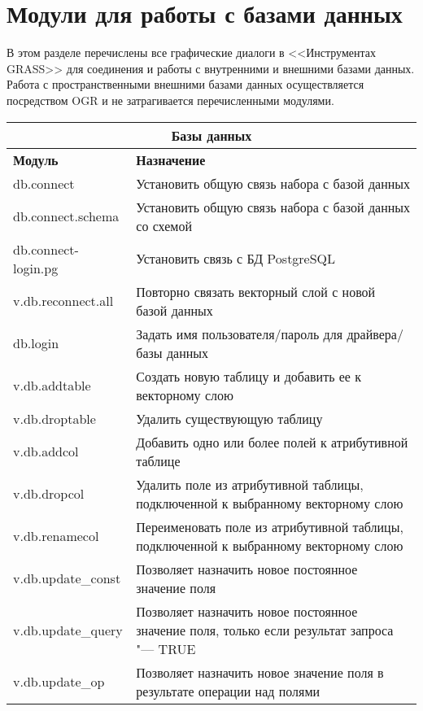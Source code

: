 \clearpage

\section{Модули для работы с базами данных}

В этом разделе перечислены все графические диалоги в <<Инструментах
GRASS>> для соединения и работы с внутренними и внешними
базами данных. Работа с пространственными внешними базами данных
осуществляется посредством OGR и не затрагивается перечисленными модулями.

{\renewcommand{\arraystretch}{0.7}
\begin{table}[H]
\centering
 \begin{tabular}{|p{4cm}|p{10cm}|}
  \hline \multicolumn{2}{|c|}{\textbf{Базы данных}} \\
  \hline \textbf{Модуль} & \textbf{Назначение} \\
  \hline db.connect & Установить общую связь набора с базой данных \\
  \hline db.connect.schema & Установить общую связь набора с базой
  данных со схемой \\
  \hline db.connect-login.pg & Установить связь с БД PostgreSQL \\
  \hline v.db.reconnect.all & Повторно связать векторный слой с новой базой
  данных \\
  \hline db.login & Задать имя пользователя/пароль для драйвера/базы
  данных \\
  \hline v.db.addtable & Создать новую таблицу и добавить ее к
  векторному слою \\
  \hline v.db.droptable & Удалить существующую таблицу \\
  \hline v.db.addcol & Добавить одно или более полей к атрибутивной
  таблице \\
  \hline v.db.dropcol & Удалить поле из атрибутивной таблицы,
  подключенной к выбранному векторному слою \\
  \hline v.db.renamecol & Переименовать поле из атрибутивной таблицы,
  подключенной к выбранному векторному слою \\
  \hline v.db.update\_const & Позволяет назначить новое постоянное
  значение поля \\
  \hline v.db.update\_query & Позволяет назначить новое постоянное
  значение поля, только если результат запроса "--- TRUE \\
  \hline v.db.update\_op & Позволяет назначить новое значение поля в
  результате операции над полями \\

\end{tabular}
\end{table}}
